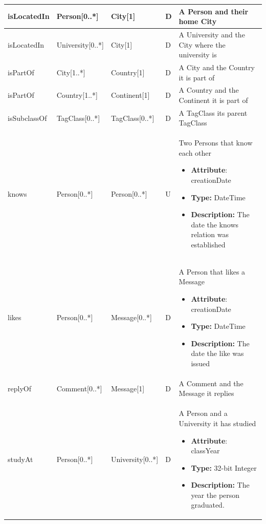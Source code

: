 \begin{longtable}{|p{2cm}|p{2.5cm}|p{2.5cm}|p{1cm}|p{7cm}|}
        \hline
        isLocatedIn & Person[0..*] & City[1] & D & A Person and their home City \\
        \hline
        isLocatedIn & University[0..*] & City[1] & D &  A University and the City where the university is \\
        \hline
        isPartOf & City[1..*] & Country[1] & D & A City and the Country it is part of \\
        \hline
        isPartOf & Country[1..*] & Continent[1] & D & A Country and the Continent it is part of \\
        \hline
        isSubclassOf & TagClass[0..*] & TagClass[0..*] & D & A TagClass its parent TagClass \\
        \hline
        knows & Person[0..*] & Person[0..*] & U & Two Persons that know each other
        \begin{itemize}
            \item \textbf{Attribute}: creationDate
            \item \textbf{Type:} DateTime
            \item \textbf{Description:}  The date the knows relation was established
        \end{itemize}
        \\
        \hline
        likes & Person[0..*] & Message[0..*] & D & A Person that likes a Message
        \begin{itemize}
            \item \textbf{Attribute}: creationDate
            \item \textbf{Type:} DateTime
            \item \textbf{Description:}  The date the like was issued
        \end{itemize}
        \\
        \hline
        replyOf & Comment[0..*] & Message[1] & D & A Comment and the Message it replies \\
        \hline
        studyAt & Person[0..*] & University[0..*] & D & A Person and a University it has studied
        \begin{itemize}
            \item \textbf{Attribute}: classYear
            \item \textbf{Type:} 32-bit Integer
            \item \textbf{Description:} The year the person graduated.
        \end{itemize}
        \\

\end{longtable}
